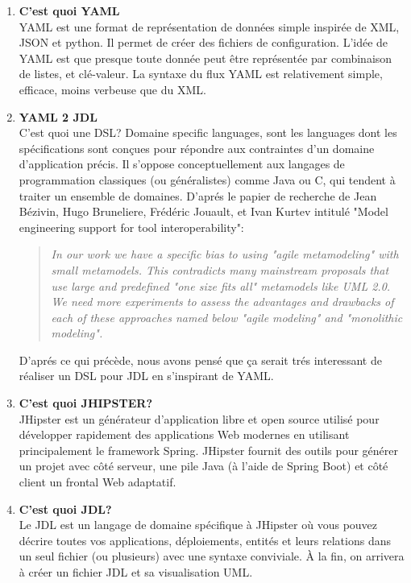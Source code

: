 \begin{enumerate}
    \def\labelenumi{\arabic{enumi}.}
    \item
      \textbf{C'est quoi YAML}\\
      YAML est une format de représentation de données simple inspirée de XML,
      JSON et python. Il permet de créer des fichiers de configuration. L'idée
      de YAML est que presque toute donnée peut être représentée par
      combinaison de listes, et clé-valeur. La syntaxe du flux YAML est
      relativement simple, efficace, moins verbeuse que du XML.

    \item
      \textbf{YAML 2 JDL}\\    
      C'est quoi une DSL? Domaine specific languages, sont les languages dont
      les spécifications sont conçues pour répondre aux contraintes d'un
      domaine d'application précis. Il s'oppose conceptuellement aux langages
      de programmation classiques (ou généralistes) comme Java ou C, qui
      tendent à traiter un ensemble de domaines.
      D'aprés le papier de recherche de Jean Bézivin, Hugo Bruneliere,
      Frédéric Jouault, et Ivan Kurtev intitulé "Model engineering support for
      tool interoperability":
      \begin{quote}
        \textit{
            In our work we have a specific bias to using "agile metamodeling" with
            small metamodels. This contradicts many mainstream proposals that use
            large and predefined "one size fits all" metamodels like UML 2.0. We
            need more experiments to assess the advantages and drawbacks of each of
            these approaches named below "agile modeling" and "monolithic modeling".
        }
    \end{quote}
      D'aprés ce qui précède, nous avons pensé que ça serait trés interessant
      de réaliser un DSL pour JDL en s'inspirant de YAML.

    \item
      \textbf{C'est quoi JHIPSTER?}\\
      JHipster est un générateur d'application libre et open source utilisé pour développer rapidement des applications Web modernes en utilisant principalement le framework Spring. JHipster fournit des outils pour générer un projet avec côté serveur, une pile Java (à l'aide de Spring Boot) et côté client un frontal Web adaptatif.

    \item
      \textbf{C'est quoi JDL?}\\
      Le JDL est un langage de domaine spécifique à JHipster où vous pouvez
      décrire toutes vos applications, déploiements, entités et leurs
      relations dans un seul fichier (ou plusieurs) avec une syntaxe
      conviviale. À la fin, on arrivera à créer un fichier JDL et sa
      visualisation UML.

\end{enumerate}

